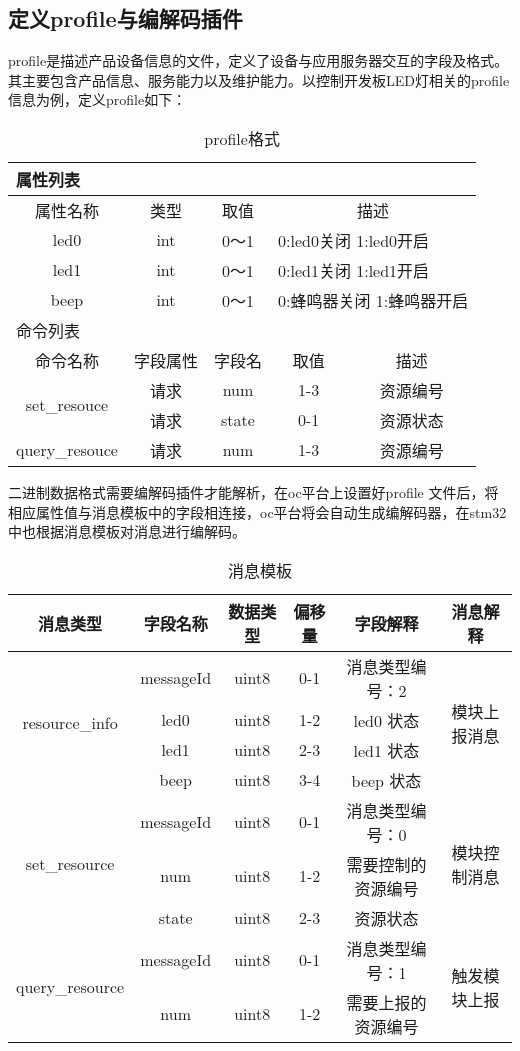 \subsection{定义profile与编解码插件}
profile是描述产品设备信息的文件，定义了设备与应用服务器交互的字段及格式。其主要包含产品信息、服务能力以及维护能力。以控制开发板LED灯相关的profile信息为例，定义profile如下：
\begin{table}[h]
\caption{profile格式}
\begin{tabular}{|c|c|c|c|c|}
\toprule
\multicolumn{5}{|l|}{属性列表} \\
\hline
属性名称 & 类型 & 取值 & \multicolumn{2}{|c|}{描述}  \\
\hline
led0 & int & 0～1 & \multicolumn{2}{|l|}{0:led0关闭 1:led0开启} \\
\hline
led1 & int & 0～1 & \multicolumn{2}{|l|}{0:led1关闭 1:led1开启} \\
\hline
beep & int & 0～1 & \multicolumn{2}{|l|}{0:蜂鸣器关闭 1:蜂鸣器开启} \\
\toprule
\multicolumn{5}{|l|}{命令列表} \\
\hline
命令名称 & 字段属性 & 字段名 & 取值 & 描述 \\
\hline
\multirow{2}{*}{set\_resouce} & 请求 & num & 1-3 & 资源编号 \\
\cmidrule{2-5}
&请求&state&0-1&资源状态 \\
\hline
query\_resouce & 请求 & num & 1-3 & 资源编号 \\
\hline
\bottomrule
\end{tabular}
\label{tablea}
\end{table}

二进制数据格式需要编解码插件才能解析，在oc平台上设置好profile 文件后，将相应属性值与消息模板中的字段相连接，oc平台将会自动生成编解码器，在stm32中也根据消息模板对消息进行编解码。

\begin{table}[h]
\caption{消息模板}
\begin{tabular}{|c|c|c|c|c|c|}
\toprule
消息类型 & 字段名称 & 数据类型 & 偏移量 & 字段解释 & 消息解释 \\
\hline
\multirow{4}{*}{resource\_info} & messageId & uint8 & 0-1 & 消息类型编号：2 & \multirow{4}{*}{模块上报消息} \\
\cmidrule{2-5}
& led0 & uint8 & 1-2 & led0 状态 & \\
\cmidrule{2-5}
& led1 & uint8 & 2-3 & led1 状态 & \\
\cmidrule{2-5}
& beep & uint8 & 3-4 & beep 状态 & \\
\hline
\multirow{3}{*}{set\_resource} & messageId & uint8 & 0-1 & 消息类型编号：0 & \multirow{3}{*}{模块控制消息} \\
\cmidrule{2-5}
& num & uint8 & 1-2 & 需要控制的资源编号 & \\
\cmidrule{2-5}
& state & uint8 & 2-3 & 资源状态 & \\
\hline
\multirow{3}{*}{query\_resource} & messageId & uint8 & 0-1 & 消息类型编号：1 & \multirow{3}{*}{触发模块上报} \\
\cmidrule{2-5}
& num & uint8 & 1-2 & 需要上报的资源编号 & \\
\bottomrule
\end{tabular}
\label{tablea}
\end{table}



